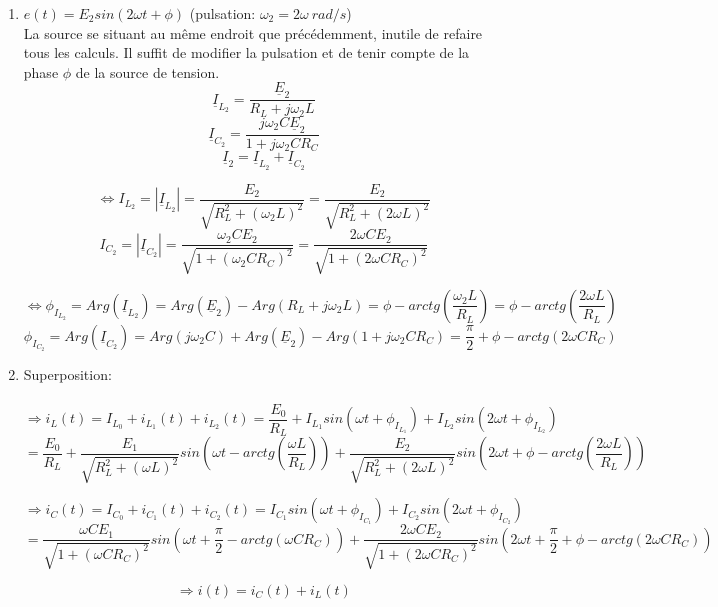 {\begin{enumerate}
$$\Leftrightarrow \phi_{I_{L_{1}}}= Arg(\underline{I}_{L_{1}})=Arg(\underline{E}_1)-Arg(R_{L}+j\omega_{1} L)=0-arctg(\frac{\omega_{1} L}{R_{L}})=-arctg(\frac{\omega L}{R_{L}})$$
$$\phi_{I_{C_{1}}}= Arg(\underline{I}_{C_{1}})=Arg(j\omega_{1} C)+Arg(\underline{E}_1)-Arg(1+j\omega_{1} CR_{C})=\frac{\pi}{2}+0-arctg(\omega_{1} CR_C)=\frac{\pi}{2}-arctg(\omega CR_C)$$

\item $e(t)=E_{2}sin(2\omega t+\phi)$ (pulsation: $\omega_{2}=2\omega\ rad/s$)\\
La source se situant au même endroit que précédemment, inutile de refaire tous les calculs. Il suffit de modifier la pulsation et de tenir compte de la phase $\phi$ de la source de tension.\\

$$\underline{I}_{L_{2}}=\frac{\underline{E}_{2}}{R_{L}+j\omega_{2} L}$$
$$\underline{I}_{C_{2}}=\frac{j\omega_{2} C\underline{E}_{2}}{1+j\omega_{2} CR_{C}}$$
$$\underline{I}_2=\underline{I}_{L_{2}}+\underline{I}_{C_{2}}$$

$$\Leftrightarrow I_{{L}_2}=|\underline{I}_{L_{2}}|=\frac{E_{2}}{\sqrt{R_{L}^{2}+(\omega_2 L)^{2}}}=\frac{E_{2}}{\sqrt{R_{L}^{2}+(2\omega L)^{2}}}$$
$$I_{{C}_2}=|\underline{I}_{C_{2}}|=\frac{\omega_2 CE_{2}}{\sqrt{1+(\omega_2 CR_{C})^{2}}}=\frac{2\omega CE_{2}}{\sqrt{1+(2\omega CR_{C})^{2}}}$$

$$\Leftrightarrow \phi_{I_{L_{2}}}= Arg(\underline{I}_{L_{2}})=Arg(\underline{E}_2)-Arg(R_{L}+j\omega_{2} L)=\phi-arctg(\frac{\omega_{2} L}{R_{L}})=\phi-arctg(\frac{2\omega L}{R_{L}})$$
$$\phi_{I_{C_{2}}}= Arg(\underline{I}_{C_{2}})=Arg(j\omega_{2} C)+Arg(\underline{E}_2)-Arg(1+j\omega_{2} CR_{C})=\frac{\pi}{2}+\phi-arctg(2\omega CR_C)$$

\item Superposition:\\\\
$$\Rightarrow i_{L}(t)=I_{L_{0}}+ i_{L_{1}}(t)+i_{L_{2}}(t)=\frac{E_{0}}{R_{L}}+I_{{L}_1}sin(\omega t+\phi_{I_{L_{1}}})+I_{{L}_2}sin(2\omega t+\phi_{I_{L_{2}}})$$
$$=\frac{E_{0}}{R_{L}}+\frac{E_{1}}{\sqrt{R_{L}^{2}+(\omega L)^{2}}}sin(\omega t-arctg(\frac{\omega L}{R_{L}}))+\frac{E_{2}}{\sqrt{R_{L}^{2}+(2\omega L)^{2}}}sin(2\omega t+\phi-arctg(\frac{2\omega L}{R_{L}}))$$

$$\Rightarrow i_{C}(t)=I_{C_{0}}+ i_{C_{1}}(t)+i_{C_{2}}(t)=I_{{C}_1}sin(\omega t+\phi_{I_{C_{1}}})+I_{{C}_2}sin(2\omega t+\phi_{I_{C_{2}}})$$
$$=\frac{\omega CE_{1}}{\sqrt{1+(\omega CR_{C})^{2}}}sin(\omega t+\frac{\pi}{2}-arctg(\omega CR_C))+\frac{2\omega CE_{2}}{\sqrt{1+(2\omega CR_{C})^{2}}}sin(2\omega t+\frac{\pi}{2}+\phi-arctg(2\omega CR_C))$$

$$\Rightarrow i(t)=i_{C}(t)+i_{L}(t)$$
\end{enumerate}
}


